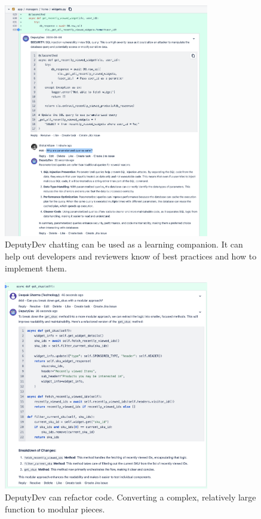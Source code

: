 \begin{appendices}
\begin{figure}[htbp]
    \centering
    \includegraphics[width=0.8\textwidth]
    {Figures/dd_param_query.png}
    \caption{DeputyDev chatting can be used as a learning companion. It can help out developers and reviewers know of best practices and how to implement them.}
    \label{fig:dd_param_query}
\end{figure}

\begin{figure}[htbp]
    \centering
    \includegraphics[width=0.8\textwidth]
    {Figures/dd_modular_code.png}
    \caption{DeputyDev can refactor code. Converting a complex, relatively large function to modular pieces.}
    \label{fig:dd_modular_code}
\end{figure}


\end{appendices}
